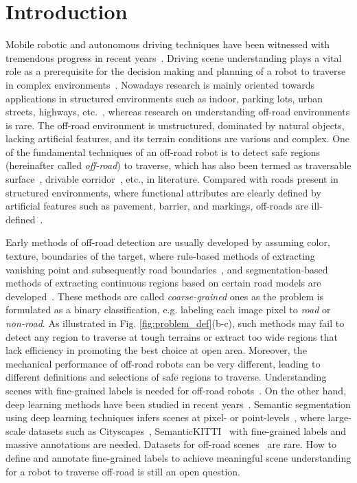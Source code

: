 \documentclass[letterpaper, 10 pt, conference]{ieeeconf}  %
\begin{document}
	\section{Introduction}
	Mobile robotic and autonomous driving techniques have been witnessed with tremendous progress in recent years~\cite{feng2020deep}. Driving scene understanding plays a vital role as a prerequisite for the decision making and planning of a robot to traverse in complex environments~\cite{badue2020self}.
	Nowadays research is mainly oriented towards applications in structured environments such as indoor, parking lots, urban streets, highways, etc.~\cite{siam2017deep},
	whereas research on understanding off-road environments is rare.
	The off-road environment is unstructured, dominated by natural objects, lacking artificial features, and its terrain conditions are various and complex.
	One of the fundamental techniques of an off-road robot is to detect safe regions (hereinafter called {\it off-road}) to traverse, which has also been termed as traversable surface~\cite{zhou2012self}, drivable corridor~\cite{nefian2006detection}, etc., in literature.
	Compared with roads present in structured environments, where functional attributes are clearly defined by artificial features such as pavement, barrier, and markings,
	off-roads are ill-defined~\cite{ososinski2015automatic}. 
	
	Early methods of off-road detection are usually developed by assuming color, texture, boundaries of the target, where rule-based methods of extracting vanishing point and subsequently road boundaries~\cite{kong2009vanishing}\cite{shi2015fast}, and segmentation-based methods of extracting continuous regions based on certain road models are developed~\cite{alon2006off}\cite{wang2009unstructured}.
	These methods are called {\it coarse-grained} ones as the problem is formulated as a binary classification, e.g. labeling each image pixel to {\it road} or {\it non-road}.
	As illustrated in Fig. \ref{fig:problem_def}(b-c), such methods may fail to detect any region to traverse at tough terrains or extract too wide regions that lack efficiency in promoting the best choice at open area.
	Moreover, the mechanical performance of off-road robots can be very different, leading to different definitions and selections of safe regions to traverse.
	Understanding scenes with fine-grained labels is needed for off-road robots~\cite{wellhausen2019should}.
	On the other hand, deep learning methods have been studied in recent years~\cite{rateke2019passive}. 
	Semantic segmentation using deep learning techniques infers scenes at pixel- or point-levels~\cite{long2015fully}, where large-scale datasets such as Cityscapes~\cite{cordts2016cityscapes}, SemanticKITTI~\cite{behley2019semantickitti} with fine-grained labels and massive annotations are needed.
	Datasets for off-road scenes~\cite{valada2016deep} are rare. How to define and annotate fine-grained labels to achieve meaningful scene understanding for a robot to traverse off-road is still an open question.  
	
\end{document}
